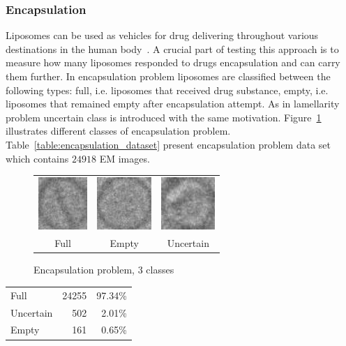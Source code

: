 \documentclass[a4paper, 11pt, table]{article}
\begin{document}
\subsubsection{Encapsulation}
\label{sec:encapsulation}

Liposomes can be used as vehicles for drug delivering throughout various destinations in the human body~\cite{betageri1993liposome}. A crucial part of testing this approach is to measure how many liposomes responded to drugs encapsulation and can carry them further. In encapsulation problem liposomes are classified between the following types: full, i.e. liposomes that received  drug substance, empty, i.e. liposomes that remained empty after encapsulation attempt. As in lamellarity problem uncertain class is introduced with the same motivation. Figure~\ref{fig:encapsulation_problem} illustrates different classes of encapsulation problem. Table~\ref{table:encapsulation_dataset} present encapsulation problem data set which contains $\num{24918}$ EM images.

\begin{figure}[H]
\centering
\begin{tabular}{ccc}
	\includegraphics[height=2cm, keepaspectratio]{problem_description/packiging/full} & \includegraphics[height=2cm, keepaspectratio]{problem_description/packiging/empty} & \includegraphics[height=2cm, keepaspectratio]{problem_description/packiging/uncertain} \\
	Full & Empty & Uncertain \\[6pt]
\end{tabular}
\caption{Encapsulation problem, 3 classes}
\label{fig:encapsulation_problem}
\end{figure}


\begin{center}
\label{table:encapsulation_dataset}
\begin{tabular}{lrr}
\toprule
Full & \num{24255} & 97.34\% \\ 
Uncertain & \num{502} & 2.01\% \\ 
Empty & \num{161} & 0.65\% \\ 
\end{tabular} 
\end{center}
\end{document}
